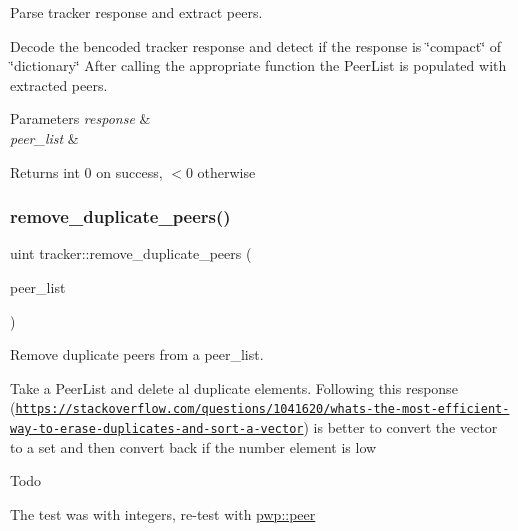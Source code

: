 Parse tracker response and extract peers. 

Decode the bencoded tracker response and detect if the response is \char`\"{}compact\char`\"{} of \char`\"{}dictionary\char`\"{} After calling the appropriate function the Peer\+List is populated with extracted peers.


\begin{DoxyParams}{Parameters}
{\em response} & \\
\hline
{\em peer\+\_\+list} & \\
\hline
\end{DoxyParams}
\begin{DoxyReturn}{Returns}
int 0 on success, $<$0 otherwise 
\end{DoxyReturn}
\mbox{\label{namespacetracker_ab1ce1ce0570dd4742e06b6941f63dbe4}} 
\subsubsection{\texorpdfstring{remove\+\_\+duplicate\+\_\+peers()}{remove\_duplicate\_peers()}}
{\footnotesize\ttfamily uint tracker\+::remove\+\_\+duplicate\+\_\+peers (\begin{DoxyParamCaption}\item[{\hyperlink{namespacepwp_ad07fa6df116b205302ad5ec172277184}{pwp\+::\+Peer\+List} \&}]{peer\+\_\+list }\end{DoxyParamCaption})}



Remove duplicate peers from a peer\+\_\+list. 

Take a Peer\+List and delete al duplicate elements. Following this response (\href{https://stackoverflow.com/questions/1041620/whats-the-most-efficient-way-to-erase-duplicates-and-sort-a-vector}{\tt https\+://stackoverflow.\+com/questions/1041620/whats-\/the-\/most-\/efficient-\/way-\/to-\/erase-\/duplicates-\/and-\/sort-\/a-\/vector}) is better to convert the vector to a set and then convert back if the number element is low \begin{DoxyRefDesc}{Todo}
\item[\hyperlink{todo__todo000003}{Todo}]The test was with integers, re-\/test with \hyperlink{structpwp_1_1peer}{pwp\+::peer}\end{DoxyRefDesc}


